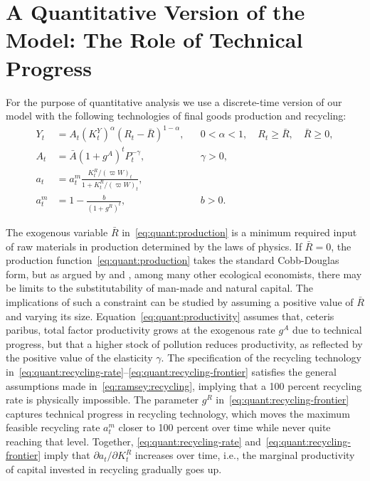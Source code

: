 \section{A Quantitative Version of the Model: The Role of Technical Progress}
\label{sec:quantitative-analysis}

For the purpose of quantitative analysis we use a discrete-time version of our model with the following technologies of final goods production and recycling:
\begin{align}
Y_t &= A_t\left(K_t^Y\right)^{\alpha}\left(R_t-\bar R\right)^{1-\alpha},
&& 
0<\alpha<1,
\quad 
R_t \ge \bar R,
\quad 
\bar R \ge 0,
\label{eq:quant:production}
\\
A_t &= \bar A\left(1+g^A\right)^t P_t^{-\gamma},
&& 
\gamma > 0,
\label{eq:quant:productivity}
\\
a_t &= a_t^m \frac{K_t^R/(\varpi W)_t}{1+K_t^R/(\varpi W)_t},
\label{eq:quant:recycling-rate}
\\
a_t^m &= 1 - \frac{b}{(1+g^R)^t},
&&
b > 0.
\label{eq:quant:recycling-frontier}
\end{align}

The exogenous variable $\bar R$ in~\eqref{eq:quant:production} is a minimum required input of raw materials in production determined by the laws of physics. If $\bar R=0$, the production function~\eqref{eq:quant:production} takes the standard Cobb-Douglas form, but as argued by \textcite{daly1977} and \textcite{stern1997}, among many other ecological economists, there may be limits to the substitutability of man-made and natural capital. The implications of such a constraint can be studied by assuming a positive value of $\bar R$ and varying its size. Equation~\eqref{eq:quant:productivity} assumes that, ceteris paribus, total factor productivity grows at the exogenous rate $g^A$ due to technical progress, but that a higher stock of pollution reduces productivity, as reflected by the positive value of the elasticity $\gamma$. The specification of the recycling technology in~\eqref{eq:quant:recycling-rate}--\eqref{eq:quant:recycling-frontier} satisfies the general assumptions made in~\eqref{eq:ramsey:recycling}, implying that a 100 percent recycling rate is physically impossible. The parameter $g^R$ in~\eqref{eq:quant:recycling-frontier} captures technical progress in recycling technology, which moves the maximum feasible recycling rate $a_t^m$ closer to 100 percent over time while never quite reaching that level. Together, \eqref{eq:quant:recycling-rate} and~\eqref{eq:quant:recycling-frontier} imply that $\partial a_t/\partial K_t^R$ increases over time, i.e., the marginal productivity of capital invested in recycling gradually goes up.

